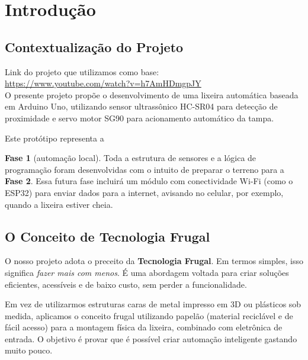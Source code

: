 \documentclass[12pt, openany, oneside, a4paper, brazilian]{abntex2}
\begin{document}
\frenchspacing

\imprimircapa
\imprimirfolhaderosto

\tableofcontents*
\cleardoublepage


\chapter{Introdução}

\section{Contextualização do Projeto}

Link do projeto que utilizamos como base:\\ \url{https://www.youtube.com/watch?v=h7AmHDmgpJY}
\\
O presente projeto propõe o desenvolvimento de uma lixeira automática
baseada em Arduino Uno, utilizando sensor ultrassônico HC-SR04 para
detecção de proximidade e servo motor SG90 para acionamento automático
da tampa.

Este protótipo representa a 

\textbf{Fase 1} (automação local). Toda a estrutura de sensores e a lógica de programação foram desenvolvidas com o intuito de preparar o terreno para a \textbf{Fase 2}. Essa futura fase incluirá um módulo com conectividade Wi-Fi (como o ESP32) para enviar dados para a internet, avisando no celular, por exemplo, quando a lixeira estiver cheia.

\section{O Conceito de Tecnologia Frugal}


O nosso projeto adota o preceito da \textbf{Tecnologia Frugal}. Em termos simples, isso significa \textit{fazer mais com menos}. É uma abordagem voltada para criar soluções eficientes, acessíveis e de baixo custo, sem perder a funcionalidade.

Em vez de utilizarmos estruturas caras de metal impresso em 3D ou plásticos sob medida, aplicamos o conceito frugal utilizando papelão (material reciclável e de fácil acesso) para a montagem física da lixeira, combinado com eletrônica de entrada. O objetivo é provar que é possível criar automação inteligente gastando muito pouco.
\end{document}
